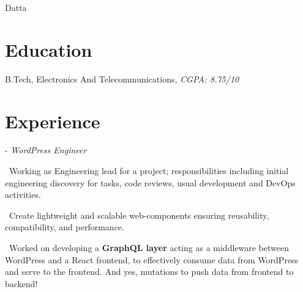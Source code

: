 \documentclass[]{resume}
\begin{document}
     
  
 {Datta}\\\vspace{4pt}\underlineheader{}




%
%
\section{Education}
\raggedright

    \hspace*{\fill}  

    B.Tech, Electronics And Telecommunications, \textit{CGPA: 8.75/10}\hspace*{\fill}

    \sectionsep


       \section{Experience}
       \raggedright
         
            - \textit{WordPress Engineer}\hspace*{\fill}  

            \textbullet\ Working as Engineering lead for a project; responsibilities including initial engineering discovery for tasks, code reviews, usual development and DevOps activities.

            \textbullet\ Create lightweight and scalable web-components ensuring reusability, compatibility, and performance. 

            \textbullet\ Worked on developing a \textbf{GraphQL layer} acting as a middleware between WordPress and a React frontend, to effectively consume data from WordPress and serve to the frontend. And yes, mutations to push data from frontend to backend!
\end{document}
